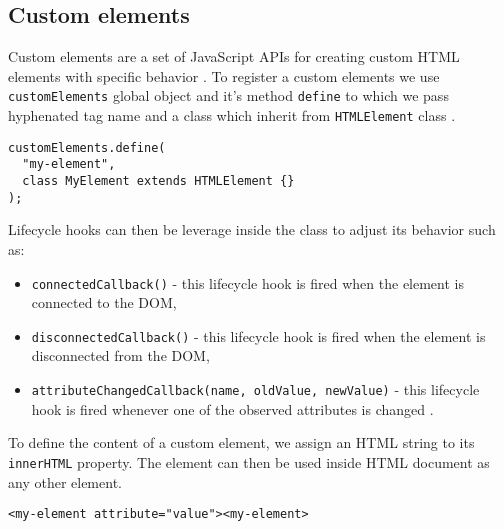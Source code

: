 \subsection{Custom elements}
Custom elements are a set of JavaScript APIs for creating custom HTML elements with specific behavior \cite{MDNWebComponents}. To register a custom elements we use \texttt{customElements} global object and it's method \texttt{define} to which we pass hyphenated tag name and a class which inherit from \texttt{HTMLElement} class \cite{EisenbergWebComponents}.
\begin{verbatim}
customElements.define(
  "my-element", 
  class MyElement extends HTMLElement {}
);
\end{verbatim}
Lifecycle hooks can then be leverage inside the class to adjust its behavior such as:
\begin{itemize}
  \item \texttt{connectedCallback()} - this lifecycle hook is fired when the element is connected to the DOM,
  \item \texttt{disconnectedCallback()} - this lifecycle hook is fired when the element is disconnected from the DOM,
  \item \texttt{attributeChangedCallback(name, oldValue, newValue)} - this lifecycle hook is fired whenever one of the observed attributes is changed \cite{EisenbergWebComponents}.
\end{itemize}
To define the content of a custom element, we assign an HTML string to its \texttt{innerHTML} property. The element can then be used inside HTML document as any other element.
\begin{verbatim}
<my-element attribute="value"><my-element>
\end{verbatim}

